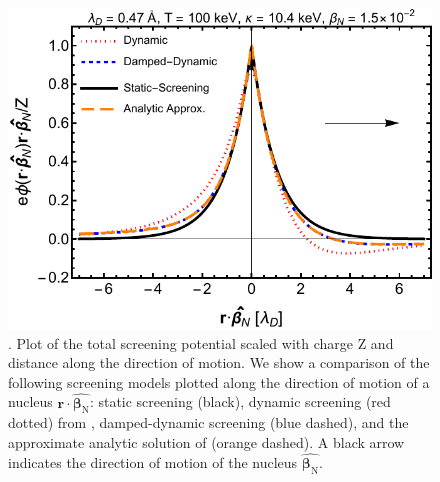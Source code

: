 \begin{figure} 
 \centerline{
\includegraphics[width=.90\linewidth]{plots/chap03BBN/phidat_100_1_1_0_full_lin.pdf}}
 \caption{ . Plot of the total screening potential scaled with charge Z and distance along the direction of motion. We show a comparison of the following screening models plotted along the direction of motion of a nucleus $\boldsymbol{r}\cdot\hat{\boldsymbol{\beta}_{\text{N}}}$: static screening (black), dynamic screening (red dotted) from \cite{Hwang:2021kno}, damped-dynamic screening (blue dashed), and the approximate analytic solution of  (orange dashed). A black arrow indicates the direction of motion of the nucleus $\hat{\boldsymbol{\beta}_{\text{N}}}$.}
 \label{fig:dynamiclinear}
\end{figure} 

